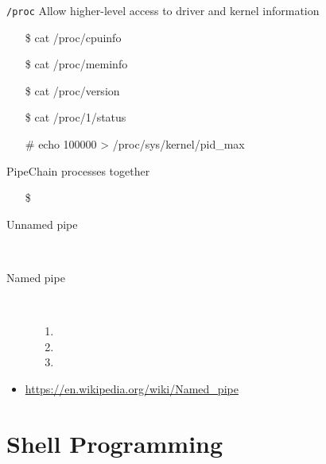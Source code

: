 \begin{frame}{\texttt{/proc}}
  Allow higher-level access to driver and kernel information
  \ttfamily
  \begin{itemize}
  \item[\$] cat /proc/cpuinfo
  \item[\$] cat /proc/meminfo
  \item[\$] cat /proc/version
  \item[\$] cat /proc/1/status
  \item[\#] echo 100000 > /proc/sys/kernel/pid\_max
  \end{itemize}
\end{frame}

\begin{frame}{Pipe}{Chain processes together}
  \begin{itemize}
  \item[\$] 
  \end{itemize}
  \begin{center}
  \end{center}
  \begin{description}
  \item[Unnamed pipe] \,\\
  \item[Named pipe] \,\\
    \begin{enumerate}
    \item {}
    \item {}
    \item {}
    \end{enumerate}
  \end{description}
\end{frame}

\begin{itemize}
\item \url{https://en.wikipedia.org/wiki/Named_pipe}
\end{itemize}

\section{Shell Programming}
\label{sec:shell-programming}


